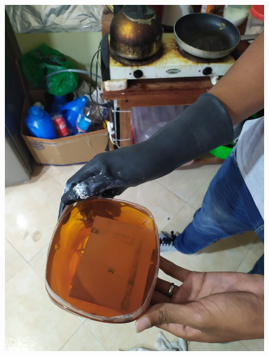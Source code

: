 \documentclass[10pt,a4paper]{article}
\begin{document}
\begin{multicols}{2}
\begin{figure}[H]
\end{figure}
\begin{figure}[H]
\centering
\includegraphics[scale=0.18]{quemar}
\end{figure}
\begin{figure}[H]
\centering

\end{figure}
\end{multicols}
\end{document}

